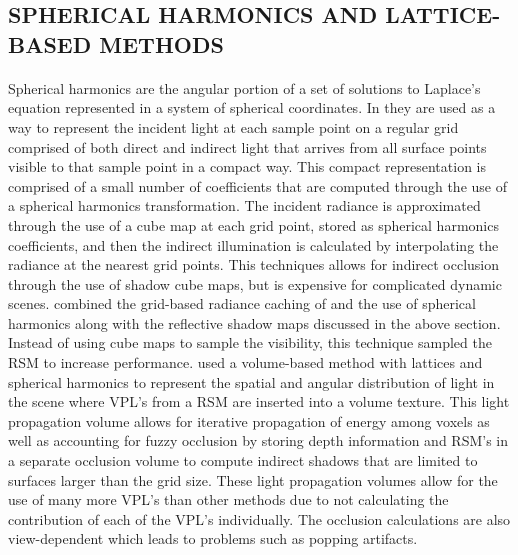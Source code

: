 \subsection{SPHERICAL HARMONICS AND LATTICE-BASED METHODS}
\paragraph{}
Spherical harmonics are the angular portion of a set of solutions to Laplace's equation represented in a system of spherical coordinates.  In \cite{Nijasure2005} they are used as a way to represent the incident light at each sample point on a regular grid comprised of both direct and indirect light that arrives from all surface points visible to that sample point in a compact way.  This compact representation is comprised of a small number of coefficients that are computed through the use of a spherical harmonics transformation.  The incident radiance is approximated through the use of a cube map at each grid point, stored as spherical harmonics coefficients, and then the indirect illumination is calculated by interpolating the radiance at the nearest grid points.  This techniques allows for indirect occlusion through the use of shadow cube maps, but is expensive for complicated dynamic scenes.  \cite{Papaioannou2011} combined the grid-based radiance caching of \cite{Nijasure2005} and the use of spherical harmonics along with the reflective shadow maps discussed in the above section.  Instead of using cube maps to sample the visibility, this technique sampled the RSM to increase performance.  \cite{Kaplanyan2010} used a volume-based method with lattices and spherical harmonics to represent the spatial and angular distribution of light in the scene where VPL's from a RSM are inserted into a volume texture.  This light propagation volume allows for iterative propagation of energy among voxels as well as accounting for fuzzy occlusion by storing depth information and RSM's in a separate occlusion volume to compute indirect shadows that are limited to surfaces larger than the grid size.  These light propagation volumes allow for the use of many more VPL's than other methods due to not calculating the contribution of each of the VPL's individually.  The occlusion calculations are also view-dependent which leads to problems such as popping artifacts.